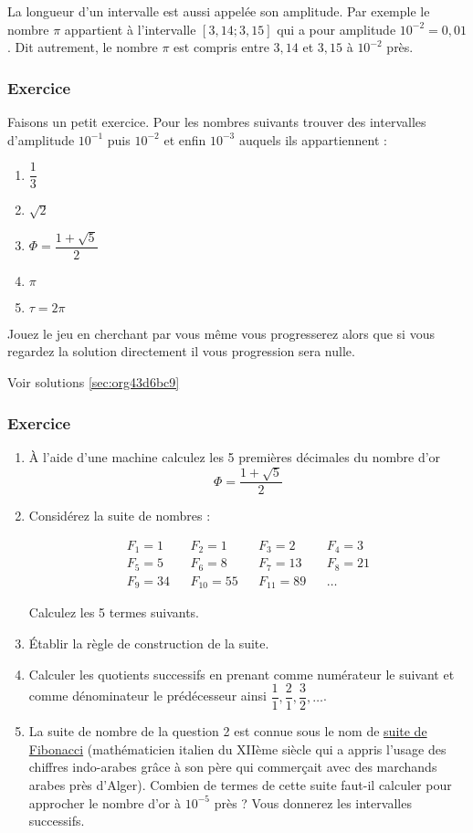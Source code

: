 \documentclass[a4paper, 11pt, twoside]{article}
\begin{document}
La longueur d'un intervalle est aussi appelée son amplitude. Par
exemple le nombre \(\pi\) appartient à l'intervalle \([3,14 ; 3,15]\)
qui a pour amplitude \(10^{-2} = 0,01\). Dit autrement, le nombre
\(\pi\) est compris entre \(3,14\) et \(3,15\) à \(10^{-2}\) près.

\subsubsection{Exercice}
\label{sec:orgb387ab9}
Faisons un petit exercice. Pour les nombres suivants trouver des
intervalles d'amplitude \(10^{-1}\) puis \(10^{-2}\) et enfin \(10^{-3}\)
auquels ils appartiennent :
\begin{enumerate}
\item \(\dfrac{1}{3}\)
\item \(\sqrt{2}\)
\item \(\Phi = \dfrac{1 + \sqrt{5}}{2}\)
\item \(\pi\)
\item \(\tau = 2\pi\)
\end{enumerate}

Jouez le jeu en cherchant par vous même vous progresserez alors que
si vous regardez la solution directement il vous progression sera
nulle.

Voir solutions \ref{sec:org43d6bc9}

\subsubsection{Exercice}
\label{sec:orgc61202f}
\begin{enumerate}
\item À l'aide d'une machine calculez les 5 premières décimales du nombre d'or
\[\Phi = \dfrac{1 + \sqrt{5}}{2}\]
\item Considérez la suite de nombres :

\begin{align*}
 F_1 = 1&& F_2 = 1&& F_3 = 2&& F_4 = 3\\
 F_5 = 5&& F_6 = 8&& F_7 = 13&& F_8 = 21\\
 F_9 = 34&& F_{10} = 55&& F_{11} = 89&&\dots
\end{align*}

Calculez les 5 termes suivants.
\item Établir la règle de construction de la suite.
\item Calculer les quotients successifs en prenant comme numérateur le
suivant et comme dénominateur le prédécesseur ainsi
\(\dfrac{1}{1}, \dfrac{2}{1}, \dfrac{3}{2},\dots\).
\item La suite de nombre de la question 2 est connue sous le nom de
\href{https://fr.wikipedia.org/wiki/Suite\_de\_Fibonacci}{suite de Fibonacci} (mathématicien italien du XIIème siècle qui a
appris l'usage des chiffres indo-arabes grâce à son père qui
commerçait avec des marchands arabes près d'Alger). Combien de
termes de cette suite faut-il calculer pour approcher le nombre
d'or à \(10^{-5}\) près ? Vous donnerez les intervalles successifs.
\end{enumerate}
\end{document}
